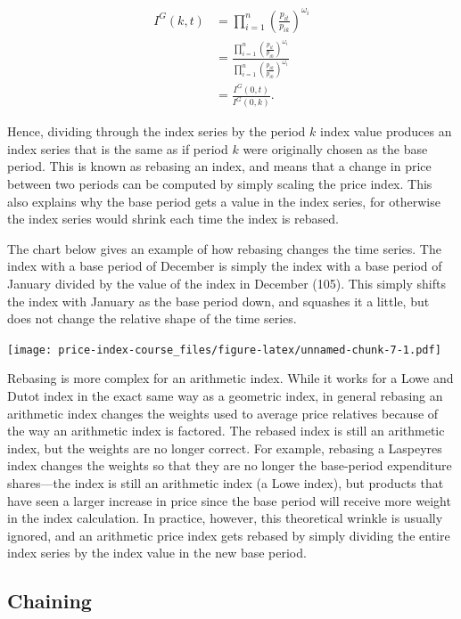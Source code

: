 \documentclass[]{article}
\begin{document}
\begin{align*}
I^{G}(k, t) &= \prod_{i = 1}^{n} \left(\frac{p_{it}}{p_{ik}}\right)^{\omega_{i}} \\
&= \frac{\prod_{i = 1}^{n} \left(\frac{p_{it}}{p_{i0}}\right)^{\omega_{i}}}{\prod_{i = 1}^{n} \left(\frac{p_{ik}}{p_{i0}}\right)^{\omega_{i}}} \\
&= \frac{I^{G}(0, t)}{I^{G}(0, k)}.
\end{align*}

Hence, dividing through the index series by the period \(k\) index value produces an index series that is the same as if period \(k\) were originally chosen as the base period. This is known as rebasing an index, and means that a change in price between two periods can be computed by simply scaling the price index. This also explains why the base period gets a value in the index series, for otherwise the index series would shrink each time the index is rebased.

The chart below gives an example of how rebasing changes the time series. The index with a base period of December is simply the index with a base period of January divided by the value of the index in December (105). This simply shifts the index with January as the base period down, and squashes it a little, but does not change the relative shape of the time series.

\texttt{[image: price-index-course\_files/figure-latex/unnamed-chunk-7-1.pdf]}

Rebasing is more complex for an arithmetic index. While it works for a Lowe and Dutot index in the exact same way as a geometric index, in general rebasing an arithmetic index changes the weights used to average price relatives because of the way an arithmetic index is factored. The rebased index is still an arithmetic index, but the weights are no longer correct. For example, rebasing a Laspeyres index changes the weights so that they are no longer the base-period expenditure shares---the index is still an arithmetic index (a Lowe index), but products that have seen a larger increase in price since the base period will receive more weight in the index calculation. In practice, however, this theoretical wrinkle is usually ignored, and an arithmetic price index gets rebased by simply dividing the entire index series by the index value in the new base period.

\hypertarget{chaining}{%
\subsection{Chaining}\label{chaining}}
\end{document}
